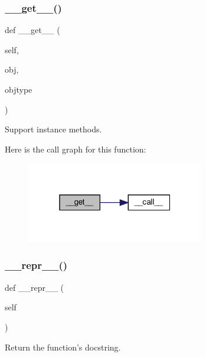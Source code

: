 \subsubsection{\texorpdfstring{\+\_\+\+\_\+get\+\_\+\+\_\+()}{\_\_get\_\_()}}
{\footnotesize\ttfamily def \+\_\+\+\_\+get\+\_\+\+\_\+ (\begin{DoxyParamCaption}\item[{}]{self,  }\item[{}]{obj,  }\item[{}]{objtype }\end{DoxyParamCaption})}

\begin{DoxyVerb}Support instance methods.
\end{DoxyVerb}
 Here is the call graph for this function\+:
\nopagebreak
\begin{figure}[H]
\begin{center}
\leavevmode
\includegraphics[width=220pt]{classvlc_1_1memoize__parameterless_ac12ab989c1cc5844c9b561a591975564_cgraph}
\end{center}
\end{figure}
\mbox{\label{classvlc_1_1memoize__parameterless_a9a47563093dfc5ba12274b66e368920c}} 
\subsubsection{\texorpdfstring{\+\_\+\+\_\+repr\+\_\+\+\_\+()}{\_\_repr\_\_()}}
{\footnotesize\ttfamily def \+\_\+\+\_\+repr\+\_\+\+\_\+ (\begin{DoxyParamCaption}\item[{}]{self }\end{DoxyParamCaption})}

\begin{DoxyVerb}Return the function's docstring.
\end{DoxyVerb}
 

